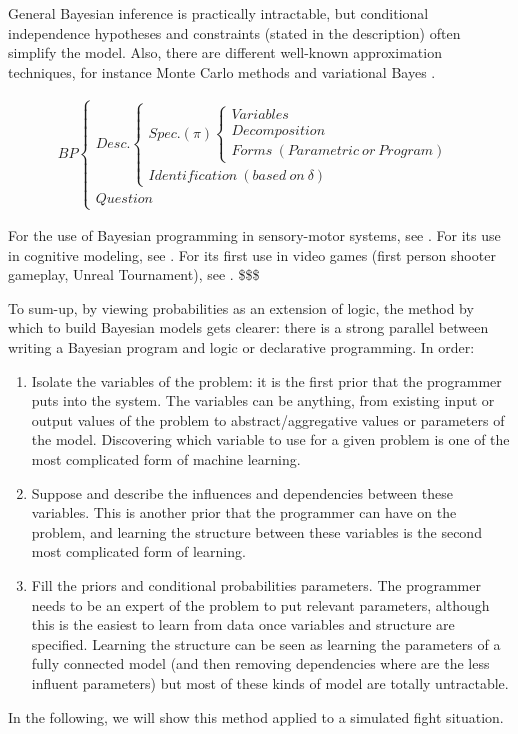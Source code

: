 General Bayesian inference is practically intractable, but conditional independence hypotheses and constraints (stated in the description) often simplify the model. Also, there are different well-known approximation techniques, for instance Monte Carlo methods \cite{MacKay} and variational Bayes \cite{Beal}.

\begin{small}
\begin{eqnarray*}
BP
\begin{cases}
Desc.
    \begin{cases}
    Spec. (\pi)
        \begin{cases}
        Variables\\
        Decomposition\\
        Forms\ (Parametric\ or\ Program)
        \end{cases}\\
    Identification\ (based\ on\ \delta)
    \end{cases}\\
Question
\end{cases}
\end{eqnarray*}
\end{small}


For the use of Bayesian programming in sensory-motor systems, see \cite{PRDMSMS}. For its use in cognitive modeling, see \cite{Colas10}. For its first use in video games (first person shooter gameplay, Unreal Tournament), see \cite{LeHy04}. \$\$\$


To sum-up, by viewing probabilities as an extension of logic, the method by which to build Bayesian models gets clearer: there is a strong parallel between writing a Bayesian program and logic or declarative programming. In order:
\begin{enumerate}
    \item Isolate the variables of the problem: it is the first prior that the programmer puts into the system. The variables can be anything, from existing input or output values of the problem to abstract/aggregative values or parameters of the model. Discovering which variable to use for a given problem is one of the most complicated form of machine learning.
    \item Suppose and describe the influences and dependencies between these variables. This is another prior that the programmer can have on the problem, and learning the structure between these variables is the second most complicated form of learning.
    \item Fill the priors and conditional probabilities parameters. The programmer needs to be an expert of the problem to put relevant parameters, although this is the easiest to learn from data once variables and structure are specified. Learning the structure can be seen as learning the parameters of a fully connected model (and then removing dependencies where are the less influent parameters) but most of these kinds of model are totally untractable.
\end{enumerate}
In the following, we will show this method applied to a simulated  fight situation.


